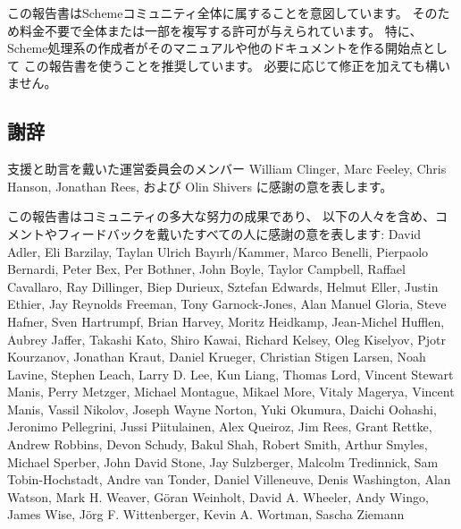 \medskip

この報告書はSchemeコミュニティ全体に属することを意図しています。
そのため料金不要で全体または一部を複写する許可が与えられています。
特に、Scheme処理系の作成者がそのマニュアルや他のドキュメントを作る開始点として
この報告書を使うことを推奨しています。
必要に応じて修正を加えても構いません。




\subsection*{謝辞}

支援と助言を戴いた運営委員会のメンバー
William Clinger, Marc Feeley, Chris Hanson, Jonathan Rees, および Olin Shivers
に感謝の意を表します。

この報告書はコミュニティの多大な努力の成果であり、
以下の人々を含め、コメントやフィードバックを戴いたすべての人に感謝の意を表します:
David Adler, Eli Barzilay, Taylan Ulrich
Bay\i{}rl\i/Kammer, Marco Benelli, Pierpaolo Bernardi,
Peter Bex, Per Bothner, John Boyle, Taylor Campbell, Raffael Cavallaro,
Ray Dillinger, Biep Durieux, Sztefan Edwards, Helmut Eller, Justin
Ethier, Jay Reynolds Freeman, Tony Garnock-Jones, Alan Manuel Gloria,
Steve Hafner, Sven Hartrumpf, Brian Harvey, Moritz Heidkamp, Jean-Michel
Hufflen, Aubrey Jaffer, Takashi Kato, Shiro Kawai, Richard Kelsey, Oleg
Kiselyov, Pjotr Kourzanov, Jonathan Kraut, Daniel Krueger, Christian
Stigen Larsen, Noah Lavine, Stephen Leach, Larry D. Lee, Kun Liang,
Thomas Lord, Vincent Stewart Manis, Perry Metzger, Michael Montague,
Mikael More, Vitaly Magerya, Vincent Manis, Vassil Nikolov, Joseph
Wayne Norton, Yuki Okumura, Daichi Oohashi, Jeronimo Pellegrini, Jussi
Piitulainen, Alex Queiroz, Jim Rees, Grant Rettke, Andrew Robbins, Devon
Schudy, Bakul Shah, Robert Smith, Arthur Smyles, Michael Sperber, John
David Stone, Jay Sulzberger, Malcolm Tredinnick, Sam Tobin-Hochstadt,
Andre van Tonder, Daniel Villeneuve, Denis Washington, Alan Watson,
Mark H.  Weaver, G\"oran Weinholt, David A. Wheeler, Andy Wingo, James
Wise, J\"org F. Wittenberger, Kevin A. Wortman, Sascha Ziemann

